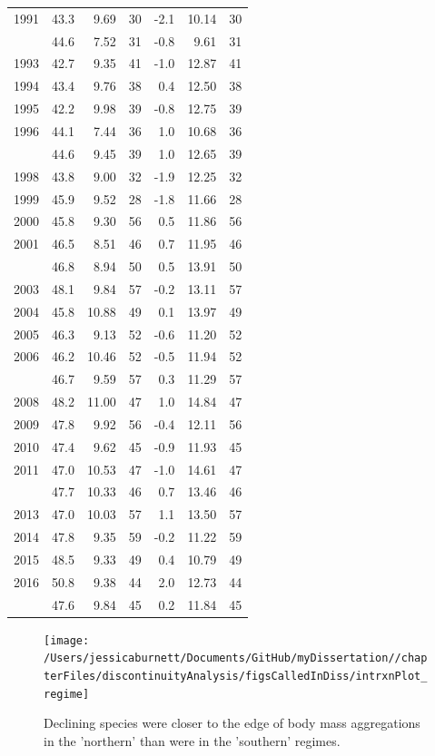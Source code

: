 \documentclass[12pt,twoside,openany]{reedthesis}
\begin{document}
\begin{longtable}{rrrrrrr}
1991 & 43.3 & 9.69 & 30 & -2.1 & 10.14 & 30\\
\addlinespace
1992 & 44.6 & 7.52 & 31 & -0.8 & 9.61 & 31\\
1993 & 42.7 & 9.35 & 41 & -1.0 & 12.87 & 41\\
1994 & 43.4 & 9.76 & 38 & 0.4 & 12.50 & 38\\
1995 & 42.2 & 9.98 & 39 & -0.8 & 12.75 & 39\\
1996 & 44.1 & 7.44 & 36 & 1.0 & 10.68 & 36\\
\addlinespace
1997 & 44.6 & 9.45 & 39 & 1.0 & 12.65 & 39\\
1998 & 43.8 & 9.00 & 32 & -1.9 & 12.25 & 32\\
1999 & 45.9 & 9.52 & 28 & -1.8 & 11.66 & 28\\
2000 & 45.8 & 9.30 & 56 & 0.5 & 11.86 & 56\\
2001 & 46.5 & 8.51 & 46 & 0.7 & 11.95 & 46\\
\addlinespace
2002 & 46.8 & 8.94 & 50 & 0.5 & 13.91 & 50\\
2003 & 48.1 & 9.84 & 57 & -0.2 & 13.11 & 57\\
2004 & 45.8 & 10.88 & 49 & 0.1 & 13.97 & 49\\
2005 & 46.3 & 9.13 & 52 & -0.6 & 11.20 & 52\\
2006 & 46.2 & 10.46 & 52 & -0.5 & 11.94 & 52\\
\addlinespace
2007 & 46.7 & 9.59 & 57 & 0.3 & 11.29 & 57\\
2008 & 48.2 & 11.00 & 47 & 1.0 & 14.84 & 47\\
2009 & 47.8 & 9.92 & 56 & -0.4 & 12.11 & 56\\
2010 & 47.4 & 9.62 & 45 & -0.9 & 11.93 & 45\\
2011 & 47.0 & 10.53 & 47 & -1.0 & 14.61 & 47\\
\addlinespace
2012 & 47.7 & 10.33 & 46 & 0.7 & 13.46 & 46\\
2013 & 47.0 & 10.03 & 57 & 1.1 & 13.50 & 57\\
2014 & 47.8 & 9.35 & 59 & -0.2 & 11.22 & 59\\
2015 & 48.5 & 9.33 & 49 & 0.4 & 10.79 & 49\\
2016 & 50.8 & 9.38 & 44 & 2.0 & 12.73 & 44\\
\addlinespace
2017 & 47.6 & 9.84 & 45 & 0.2 & 11.84 & 45\\
\bottomrule
\end{longtable}
\begin{figure}
\texttt{[image: /Users/jessicaburnett/Documents/GitHub/myDissertation//chapterFiles/discontinuityAnalysis/figsCalledInDiss/intrxnPlot\_regime]} \caption{Declining species were closer to the edge of body mass aggregations in the 'northern' than were in the 'southern' regimes.}\label{fig:intrxnPlot-regime}
\end{figure}
\end{document}

